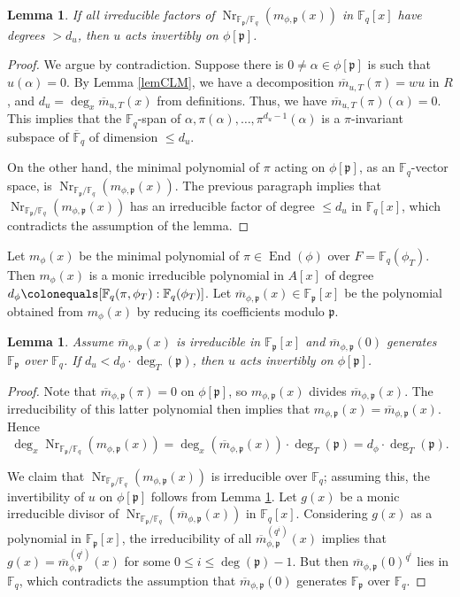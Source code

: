 \documentclass[12pt]{amsart}
\newtheorem{lem}[thm]{Lemma}
\theoremstyle{definition}
\theoremstyle{remark}
\numberwithin{equation}{section}
\numberwithin{thm}{section}
\DeclareMathOperator{\End}{End}
\DeclareMathOperator{\Nr}{Nr}
\newcommand{\fp}{\mathfrak{p}}
\newcommand{\F}{\mathbb{F}}
\newcommand{\oF}{\overline{\F}}
\begin{document}
\begin{lem}\label{lemPrelim1}  If all 
	irreducible factors of 	$\Nr_{\F_\fp/\F_q}(m_{\phi, \fp}(x))$ in $\F_q[x]$ have degrees $> d_u$, then
	$u$ acts invertibly on $\phi[\fp]$. 
\end{lem} 

\begin{proof} We argue by contradiction. Suppose there is $0\neq \alpha\in \phi[\fp]$ is such that $u(\alpha)=0$. 
	By Lemma \ref{lemCLM}, we have a decomposition $\overline{m}_{u, T}(\pi)=wu$ in $R$, and $d_u=\deg_x\overline{m}_{u, T}(x)$ 
	from definitions. Thus, we have $\overline{m}_{u, T}(\pi)(\alpha)=0$.  This implies that the $\F_q$-span 
	of $\alpha, \pi(\alpha), \dots, \pi^{d_u-1}(\alpha)$ is a $\pi$-invariant subspace of $\oF_q$ of dimension $\leq d_u$. 
	
	On the other hand, the minimal polynomial of $\pi$ acting on $\phi[\fp]$,  
	as an $\F_q$-vector space, is $\Nr_{\F_\fp/\F_q}(m_{\phi, \fp}(x))$. The previous paragraph implies that 
	$\Nr_{\F_\fp/\F_q}(m_{\phi, \fp}(x))$ 
	has an irreducible factor of degree $\leq d_u$ in $\F_q[x]$, which contradicts the assumption of the lemma. 
\end{proof}

Let $m_\phi(x)$ be the minimal polynomial of $\pi\in \End(\phi)$ over $F=\F_q(\phi_T)$. Then $m_\phi(x)$ 
is a monic irreducible polynomial in $A[x]$ of degree $d_\phi\colonequals [\F_q(\pi, \phi_T):\F_q(\phi_T)]$. 
Let $\overline{m}_{\phi, \fp}(x)\in \F_\fp[x]$ be the polynomial obtained from $m_\phi(x)$ by reducing its coefficients 
modulo $\fp$. 


\begin{lem}\label{cor2.2} 
	Assume  $\overline{m}_{\phi, \fp}(x)$ is irreducible in $\F_\fp[x]$ and $\overline{m}_{\phi, \fp}(0)$ generates $\F_\fp$ over $\F_q$. 
If $d_u< d_\phi\cdot \deg_T(\fp)$,  
	then $u$ acts invertibly on $\phi[\fp]$. 
\end{lem}
\begin{proof} Note that $\overline{m}_{\phi, \fp}(\pi)=0$ on $\phi[\fp]$, so $m_{\phi, \fp}(x)$ divides $\overline{m}_{\phi, \fp}(x)$. 
	The irreducibility of this latter polynomial then implies that $m_{\phi, \fp}(x)=\overline{m}_{\phi, \fp}(x)$. 
	Hence 
	$$
	\deg_x\Nr_{\F_\fp/\F_q}(m_{\phi, \fp}(x)) = \deg_x(\overline{m}_{\phi, \fp}(x)) \cdot \deg_T(\fp)=d_\phi\cdot \deg_T(\fp). 
	$$
	
	We claim that $\Nr_{\F_\fp/\F_q}(m_{\phi, \fp}(x))$ is irreducible over $\F_q$; assuming this, the invertibility of $u$ 
	on $\phi[\fp]$ follows from Lemma \ref{lemPrelim1}.  
	Let $g(x)$ be a monic irreducible divisor of $\Nr_{\F_\fp/\F_q}(\overline{m}_{\phi, \fp}(x))$ in $\F_q[x]$. Considering $g(x)$ as a polynomial in $\F_\fp[x]$, 
	the irreducibility of all $\overline{m}_{\phi, \fp}^{(q^i)}(x)$ implies that $g(x)=\overline{m}_{\phi, \fp}^{(q^i)}(x)$ for some $0\leq i\leq \deg(\fp)-1$. 
	But then $\overline{m}_{\phi, \fp}(0)^{q^i}$ lies in $\F_q$,  which contradicts the assumption that $\overline{m}_{\phi, \fp}(0)$ generates $\F_\fp$ over $\F_q$. 
\end{proof}
\end{document}
